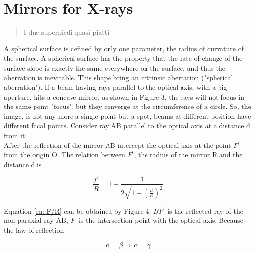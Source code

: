 \chapter{Mirrors for X-rays}
\label{capitolo2}
\thispagestyle{empty}

\begin{quotation}
{\footnotesize
{}
\begin{flushright}
I due superpiedi quasi piatti
\end{flushright}
}
\end{quotation}
\vspace{0.5cm}

\noindent A spherical surface is defined by only one parameter, the radius of curvature of the surface. A spherical surface has the property that the rate of change of the surface slope is exactly the same everywhere on the surface, and thus the aberration is inevitable. This shape bring an intrinsic aberration ("spherical aberration").
If a beam having rays parallel to the optical axis, with a big aperture,  hits a concave mirror, as shown in Figure 3, the rays will not focus in the same point "focus", but they converge at the circumference of a circle. So, the image, is not any more a single point but a spot, beams at different position have different focal points. Consider ray AB parallel to the optical axis at a distance d from it
\\
\noindent After the reflection of the mirror AB intercept the optical axis at the point $F^{'} $ from the origin O. The relation between $F^{'} $, the radius of the mirror R and the distance d is

\begin{equation}
	\frac{f{'}}{R}=1 - \frac{1}{2 \sqrt{1 - \left(\frac{d}{R} \right)^2}}
	\label{eq: f/R}
\end{equation}

\noindent Equation \ref{eq: F/R} can be obtained by Figure 4. $BF^{'} $ is the reflected ray of the non-paraxial ray AB, $F^{'} $ is the intersection point with the optical axis. Because the law of reflection

\begin{equation}
	\alpha = \beta  \Rightarrow \alpha=\gamma
	\label{eq: alpha=beta}
\end{equation}

